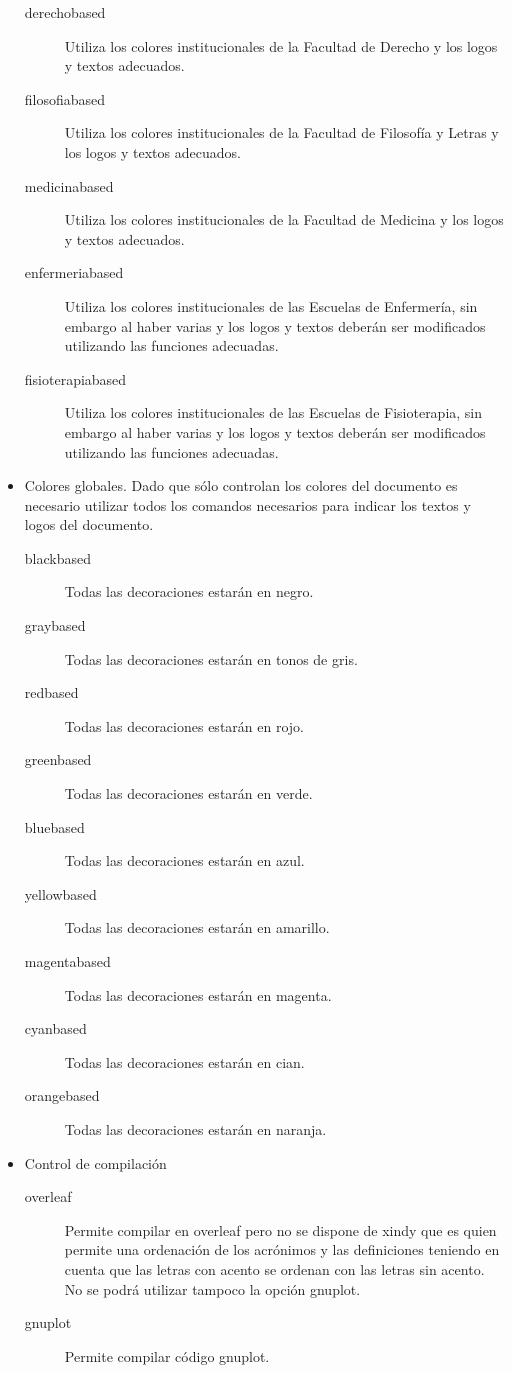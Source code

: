\begin{itemize}
\begin{description}
    \item [derechobased] Utiliza los colores institucionales de la Facultad de Derecho y los logos y textos adecuados.
    \item [filosofiabased] Utiliza los colores institucionales de la Facultad de Filosofía y Letras y los logos y textos adecuados.
    \item [medicinabased] Utiliza los colores institucionales de la Facultad de Medicina y los logos y textos adecuados.
    \item [enfermeriabased] Utiliza los colores institucionales de las Escuelas de Enfermería, sin embargo al haber varias y los logos y textos deberán ser modificados utilizando las funciones adecuadas.
    \item [fisioterapiabased] Utiliza los colores institucionales de las Escuelas de Fisioterapia, sin embargo al haber varias y los logos y textos deberán ser modificados utilizando las funciones adecuadas.
  \end{description}
  \item Colores globales. Dado que sólo controlan los colores del documento es necesario utilizar todos los comandos necesarios para indicar los textos y logos del documento.
    \begin{description}
      \item [blackbased] Todas las decoraciones estarán en negro.
      \item [graybased] Todas las decoraciones estarán en tonos de gris.
      \item [redbased] Todas las decoraciones estarán en rojo.
      \item [greenbased] Todas las decoraciones estarán en verde.
      \item [bluebased] Todas las decoraciones estarán en azul.
      \item [yellowbased] Todas las decoraciones estarán en amarillo.
      \item [magentabased] Todas las decoraciones estarán en magenta.
      \item [cyanbased] Todas las decoraciones estarán en cian.
      \item [orangebased] Todas las decoraciones estarán en naranja.
    \end{description}
    \item Control de compilación
      \begin{description}
        \item [overleaf] Permite compilar en overleaf pero no se dispone de xindy que es quien permite una ordenación de los acrónimos y las definiciones teniendo en cuenta que las letras con acento se ordenan con las letras sin acento. No se podrá utilizar tampoco la opción gnuplot.
        \item [gnuplot] Permite compilar código gnuplot.
      \end{description}
\end{itemize}
